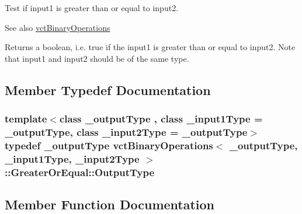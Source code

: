 Test if input1 is greater than or equal to input2. 

\begin{DoxySeeAlso}{See also}
\hyperlink{classvct_binary_operations}{vct\+Binary\+Operations}
\end{DoxySeeAlso}
Returns a boolean, i.\+e. true if the input1 is greater than or equal to input2. Note that input1 and input2 should be of the same type. 

\subsection{Member Typedef Documentation}
\hypertarget{classvct_binary_operations_1_1_greater_or_equal_aeb46d29e2a560982db8181d297538b4b}{}
\subsubsection[{Output\+Type}]{\setlength{\rightskip}{0pt plus 5cm}template$<$class \+\_\+output\+Type , class \+\_\+input1\+Type  = \+\_\+output\+Type, class \+\_\+input2\+Type  = \+\_\+output\+Type$>$ typedef \+\_\+output\+Type {\bf vct\+Binary\+Operations}$<$ \+\_\+output\+Type, \+\_\+input1\+Type, \+\_\+input2\+Type $>$\+::{\bf Greater\+Or\+Equal\+::\+Output\+Type}}\label{classvct_binary_operations_1_1_greater_or_equal_aeb46d29e2a560982db8181d297538b4b}


\subsection{Member Function Documentation}
\hypertarget{classvct_binary_operations_1_1_greater_or_equal_aa156cb77e1aca08bde00f5042edfb878}{}
